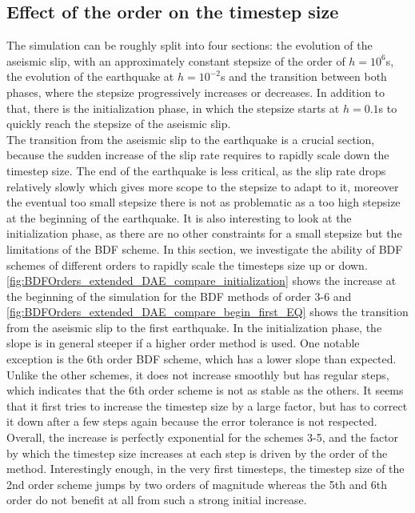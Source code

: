\subsection{Effect of the order on the timestep size}
The simulation can be roughly split into four sections: the evolution of the aseismic slip, with an approximately constant stepsize of the order of $h=10^6$s, the evolution of the earthquake at $h=10^{-2}$s and the transition between both phases, where the stepsize progressively increases or decreases. In addition to that, there is the initialization phase, in which the stepsize starts at $h=0.1$s to quickly reach the stepsize of the aseismic slip. \\
The transition from the aseismic slip to the earthquake is a crucial section, because the sudden increase of the slip rate requires to rapidly scale down the timestep size. The end of the earthquake is less critical, as the slip rate drops relatively slowly which gives more scope to the stepsize to adapt to it, moreover the eventual too small stepsize there is not as problematic as a too high stepsize at the beginning of the earthquake. It is also interesting to look at the initialization phase, as there are no other constraints for a small stepsize but the limitations of the BDF scheme. In this section, we investigate the ability of BDF schemes of different orders to rapidly scale the timesteps size up or down. \\
\autoref{fig:BDFOrders_extended_DAE_compare_initialization} shows the increase at the beginning of the simulation for the BDF methods of order 3-6 and \autoref{fig:BDFOrders_extended_DAE_compare_begin_first_EQ} shows the transition from the aseismic slip to the first earthquake. In the initialization phase, the slope is in general steeper if a higher order method is used. One notable exception is the 6th order BDF scheme, which has a lower slope than expected. Unlike the other schemes, it does not increase smoothly but has regular steps, which indicates that the 6th order scheme is not as stable as the others. It seems that it first tries to increase the timestep size by a large factor, but has to correct it down after a few steps again because the error tolerance is not respected. Overall, the increase is perfectly exponential for the schemes 3-5, and the factor by which the timestep size increases at each step is driven by the order of the method. Interestingly enough, in the very first timesteps,  the timestep size of the 2nd order scheme jumps by two orders of magnitude whereas the 5th and 6th order do not benefit at all from such a strong initial increase. 

